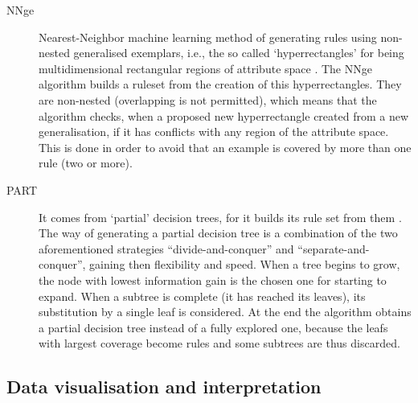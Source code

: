 \begin{description}
   \item[NNge] Nearest-Neighbor machine learning method of generating rules using non-nested generalised exemplars, i.e., the so called `hyperrectangles' for being multidimensional rectangular regions of attribute space \cite{Martin1995}. The NNge algorithm builds a ruleset from the creation of this hyperrectangles. They are non-nested (overlapping is not permitted), which means that the algorithm checks, when a proposed new hyperrectangle created from a new generalisation, if it has conflicts with any region of the attribute space. This is done in order to avoid that an example is covered by more than one rule (two or more).
   \item[PART] It comes from `partial' decision trees, for it builds its rule set from them \cite{Frank1998}. The way of generating a partial decision tree is a combination of the two aforementioned strategies ``divide-and-conquer'' and ``separate-and-conquer'', gaining then flexibility and speed. When a tree begins to grow, the node with lowest information gain is the chosen one for starting to expand. When a subtree is complete (it has reached its leaves), its substitution by a single leaf is considered. At the end the algorithm obtains a partial decision tree instead of a fully explored one, because the leafs with largest coverage become rules and some subtrees are thus discarded.
 \end{description} 

\subsection{Data visualisation and interpretation}